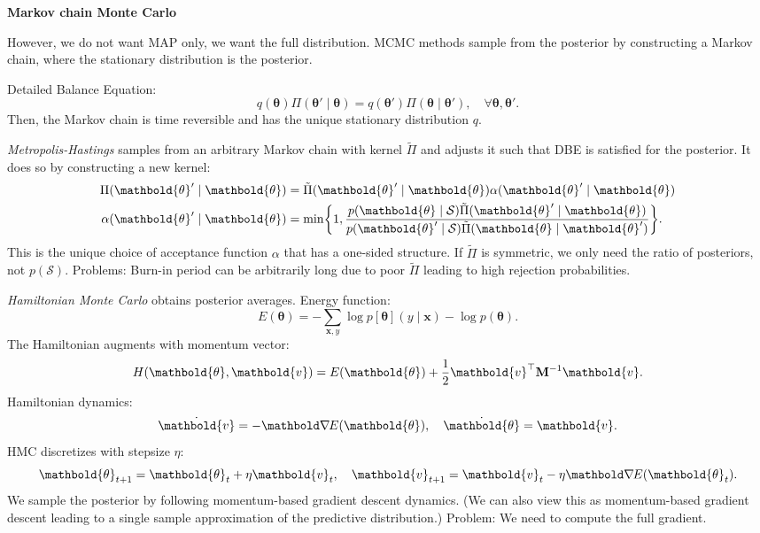 \documentclass[10pt]{article}
\newenvironment{topic}[1]
{\textbf{\sffamily \footnotesize \colorbox{black}{\rlap{\textbf{\textcolor{white}{#1}}}\hspace{\linewidth}\hspace{-2\fboxsep}}}}
{}
\newenvironment{subtopic}[1]
{\vspace{0.1cm} \begin{center}\textbf{\footnotesize \sffamily #1}\end{center}}
{}
\renewcommand{\mat}[1]{\ensuremath{\mathbf{#1}}}
\renewcommand{\vec}[1]{\ensuremath{\mathbold{#1}}}
\begin{document}
\begin{multicols*}{3}
\begin{topic}{Bayesian learning}
        \begin{subtopic}{Markov chain Monte Carlo}
            However, we do not want MAP only, we want the full distribution. MCMC methods sample from
            the posterior by constructing a Markov chain, where the stationary distribution is the
            posterior.

            Detailed Balance Equation: \[
                q(\vec{\theta}) \Pi(\vec{\theta}' \mid \vec{\theta}) = q(\vec{\theta}') \Pi(\vec{\theta} \mid \vec{\theta}'), \quad \forall \vec{\theta}, \vec{\theta}'.
            \]
            Then, the Markov chain is time reversible and has the unique stationary distribution $q$.

            \textit{Metropolis-Hastings} samples from an arbitrary Markov chain with kernel $\tilde{\Pi}$ and adjusts it
            such that DBE is satisfied for the posterior. It does so by constructing a new kernel:
            \begin{align*}
                \Pi(\vec{\theta}' \mid \vec{\theta})    & = \tilde{\Pi}(\vec{\theta}' \mid \vec{\theta}) \alpha(\vec{\theta}' \mid \vec{\theta})                                                                                                        \\
                \alpha(\vec{\theta}' \mid \vec{\theta}) & = \min \lft\{ 1, \frac{p(\vec{\theta} \mid \mathcal{S}) \tilde{\Pi}(\vec{\theta}' \mid \vec{\theta})}{p(\vec{\theta}' \mid \mathcal{S}) \tilde{\Pi}(\vec{\theta} \mid \vec{\theta}')} \rgt\}.
            \end{align*}
            This is the unique choice of acceptance function $\alpha$ that has a one-sided structure. If $\tilde{\Pi}$ is
            symmetric, we only need the ratio of posteriors, not $p(\mathcal{S})$. Problems: Burn-in
            period can be arbitrarily long due to poor $\tilde{\Pi}$ leading to high rejection
            probabilities.

            \textit{Hamiltonian Monte Carlo} obtains posterior averages. Energy function: \[
                E(\vec{\theta}) = - \sum_{\vec{x},y} \log p[\vec{\theta}](y \mid \vec{x}) - \log p(\vec{\theta}).
            \]
            The Hamiltonian augments with momentum vector: \[
                H(\vec{\theta}, \vec{v}) = E(\vec{\theta}) + \frac{1}{2} \transpose{\vec{v}} \inv{\mat{M}} \vec{v}.
            \]
            Hamiltonian dynamics: \[
                \dot{\vec{v}} = -\grad{E(\vec{\theta})}{}, \quad \dot{\vec{\theta}} = \vec{v}.
            \]
            HMC discretizes with stepsize $\eta$: \[
                \vec{\theta}_{t+1} = \vec{\theta}_t + \eta \vec{v}_t, \quad \vec{v}_{t+1} = \vec{v}_t - \eta \grad{E(\vec{\theta}_t)}{}.
            \]
            We sample the posterior by following momentum-based gradient descent dynamics. (We can also view
            this as momentum-based gradient descent leading to a single sample approximation of the predictive
            distribution.) Problem: We need to compute the full gradient.


\end{subtopic}
\end{topic}
\end{multicols*}
\end{document}

